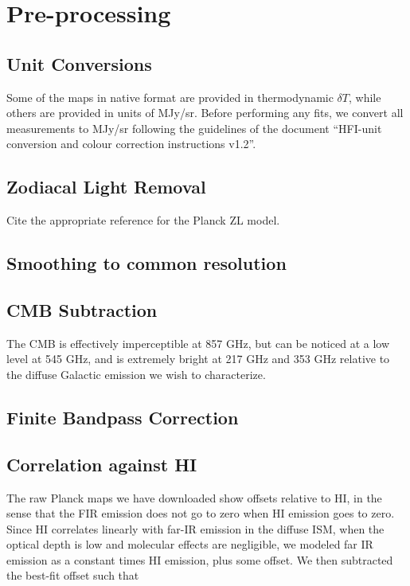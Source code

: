 \documentclass{emulateapj}
\begin{document}
\section{Pre-processing}

\subsection{Unit Conversions}

Some of the maps in native format are provided in thermodynamic $\delta T$, 
while others are provided in units of MJy/sr. Before performing any fits, 
we convert all measurements to MJy/sr following the guidelines of the document
``HFI-unit conversion and colour correction instructions v1.2''.

\subsection{Zodiacal Light Removal}
Cite the appropriate reference for the Planck ZL model.

\subsection{Smoothing to common resolution}

\subsection{CMB Subtraction}
The CMB is effectively imperceptible at 857 GHz, but can be noticed at a 
low level at 545 GHz, and is extremely bright at 217 GHz and 353 GHz relative 
to the diffuse Galactic emission we wish to characterize.


\subsection{Finite Bandpass Correction}

\subsection{Correlation against HI}
The raw Planck maps we have downloaded show offsets relative to HI, in the
sense that the FIR emission does not go to zero when HI emission goes to
zero. Since HI correlates linearly with far-IR emission in the diffuse ISM, 
when the optical depth is low and molecular effects are negligible, we modeled
far IR emission as a constant times HI emission, plus some offset. We then
subtracted the best-fit offset such that 
\end{document}
